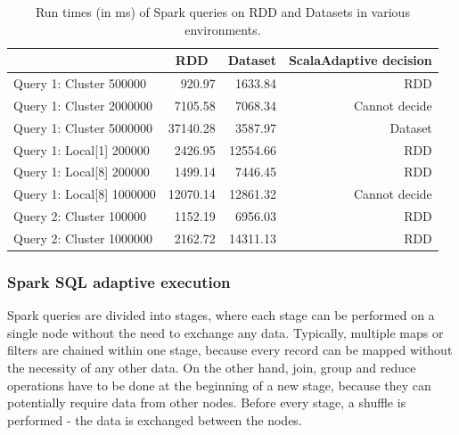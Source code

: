 \begin{table}[h!]
	\centering
	\captionsetup{justification=centering,margin=0.5cm}
	\bgroup
	\def\arraystretch{1.5}%
	\begin{tabular}{|l|r|r|r|}
		\hline
		& \multicolumn{1}{c|}{\textbf{RDD}} & \multicolumn{1}{c|}{\textbf{Dataset}} & \multicolumn{1}{c|}{\textbf{ScalaAdaptive decision}} \\ \hline
		Query 1: Cluster 500000       & 920.97                            & 1633.84                           & RDD                                                  \\ \hline
		Query 1: Cluster 2000000      & 7105.58                           & 7068.34                           & Cannot decide                                         \\ \hline
		Query 1: Cluster 5000000      & 37140.28                          & 3587.97                           & Dataset                                                  \\ \hline
		Query 1: Local{[}1{]} 200000  & 2426.95                           & 12554.66                          & RDD                                                  \\ \hline
		Query 1: Local{[}8{]} 200000  & 1499.14                           & 7446.45                           & RDD                                                  \\ \hline
		Query 1: Local{[}8{]} 1000000 & 12070.14                          & 12861.32                          & Cannot decide                                         \\ \hline
		Query 2: Cluster 100000 & 1152.19 &	6956.03 & RDD \\ \hline
		Query 2: Cluster 1000000      & 2162.72                           & 14311.13                          & RDD                                                  \\ \hline
	\end{tabular}
\egroup
\caption{Run times (in ms) of Spark queries on RDD and Datasets in various environments.}
\label{tab:spark_adaptive_rdd_vs_ds_test}
\end{table}

\subsubsection{Spark SQL adaptive execution}

Spark queries are divided into stages, where each stage can be performed on a single node without the need to exchange any data. Typically, multiple maps or filters are chained within one stage, because every record can be mapped without the necessity of any other data. On the other hand, join, group and reduce operations have to be done at the beginning of a new stage, because they can potentially require data from other nodes. Before every stage, a shuffle is performed - the data is exchanged between the nodes. 


